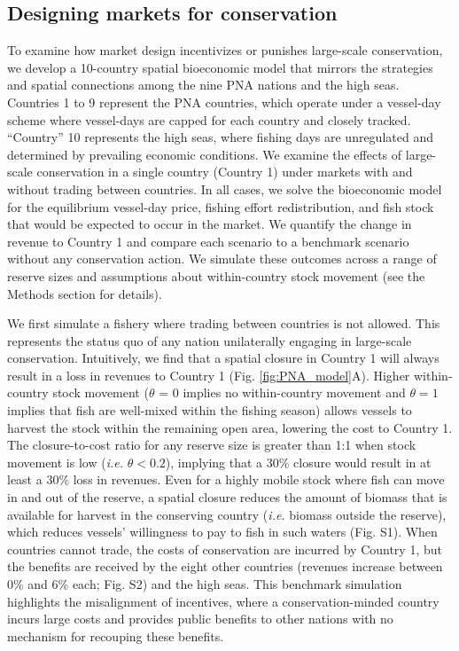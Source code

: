 \documentclass[12pt]{article}
\begin{document}
\subsection{Designing markets for conservation}

To examine how market design incentivizes or punishes large-scale conservation, we develop a 10-country spatial bioeconomic model that mirrors the strategies and spatial connections among the nine PNA nations and the high seas. Countries 1 to 9 represent the PNA countries, which operate under a vessel-day scheme where vessel-days are capped for each country and closely tracked. ``Country'' 10 represents the high seas, where fishing days are unregulated and determined by prevailing economic conditions. We examine the effects of large-scale conservation in a single country (Country 1) under markets with and without trading between countries. In all cases, we solve the bioeconomic model for the equilibrium vessel-day price, fishing effort redistribution, and fish stock that would be expected to occur in the market. We quantify the change in revenue to Country 1 and compare each scenario to a benchmark scenario without any conservation action. We simulate these outcomes across a range of reserve sizes and assumptions about within-country stock movement (see the Methods section for details).

We first simulate a fishery where trading between countries is not allowed. This represents the status quo of any nation unilaterally engaging in large-scale conservation. Intuitively, we find that a spatial closure in Country 1 will always result in a loss in revenues to Country 1 (Fig. \ref{fig:PNA_model}A). Higher within-country stock movement ($\theta$ = 0 implies no within-country movement and $\theta = 1$ implies that fish are well-mixed within the fishing season) allows vessels to harvest the stock within the remaining open area, lowering the cost to Country 1. The closure-to-cost ratio for any reserve size is greater than 1:1 when stock movement is low (\emph{i.e.} $\theta < 0.2$), implying that a 30\% closure would result in at least a 30\% loss in revenues. Even for a highly mobile stock where fish can move in and out of the reserve, a spatial closure reduces the amount of biomass that is available for harvest in the conserving country (\emph{i.e.} biomass outside the reserve), which reduces vessels' willingness to pay to fish in such waters (Fig. S1). When countries cannot trade, the costs of conservation are incurred by Country 1, but the benefits are received by the eight other countries (revenues increase between 0\% and 6\% each; Fig. S2) and the high seas. This benchmark simulation highlights the misalignment of incentives, where a conservation-minded country incurs large costs and provides public benefits to other nations with no mechanism for recouping these benefits.
\end{document}

